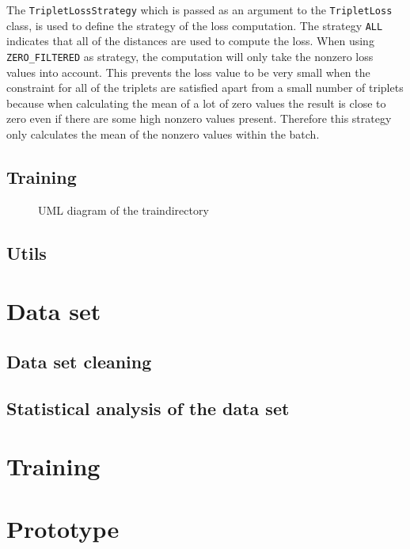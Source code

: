 \newline
\newline
The \texttt{TripletLossStrategy} which is passed as an argument to the \texttt{TripletLoss} class, is used to define the strategy of the loss computation. The strategy \texttt{ALL} indicates that all of the distances are used to compute the loss. When using \texttt{ZERO\_FILTERED} as strategy, the computation will only take the nonzero loss values into account. This prevents the loss value to be very small when the constraint for all of the triplets are satisfied apart from a small number of triplets because when calculating the mean of a lot of zero values the result is close to zero even if there are some high nonzero values present. Therefore this strategy only calculates the mean of the nonzero values within the batch.

\subsection{Training}
\label{sub:Component-Training}
\begin{figure}[htbp]
	\centering
	\caption{UML diagram of the \flqq train\frqq directory}
	\label{fig:UML-Train}
\end{figure}
\noindent

\subsection{Utils}
\label{sub:Component-Utils}

\section{Data set}
\label{sec:Data-Set}

\subsection{Data set cleaning}
\label{sub:Data-Set-Cleaning}

\subsection{Statistical analysis of the data set}
\label{sub:Statistical-Analysis-Data-Set}

\section{Training}
\label{sec:Training}

\section{Prototype}
\label{sec:Prototype}
